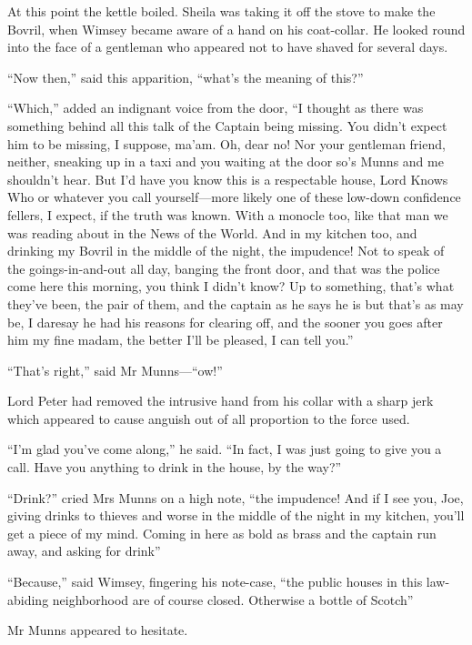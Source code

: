 At this point the kettle boiled. Sheila was taking it off the stove to make the Bovril, when Wimsey became aware of a hand on his coat-collar. He looked round into the face of a gentleman who appeared not to have shaved for several days.

\enquote{Now then,} said this apparition, \enquote{what's the meaning of this?}

\enquote{Which,} added an indignant voice from the door, \enquote{I thought as there was something behind all this talk of the Captain being missing. You didn't expect him to be missing, I suppose, ma'am. Oh, dear no! Nor your gentleman friend, neither, sneaking up in a taxi and you waiting at the door so's Munns and me shouldn't hear. But I'd have you know this is a respectable house, Lord Knows Who or whatever you call yourself\allowbreak---\allowbreak more likely one of these low-down confidence fellers, I expect, if the truth was known. With a monocle too, like that man we was reading about in the News of the World. And in my kitchen too, and drinking my Bovril in the middle of the night, the impudence! Not to speak of the goings-in-and-out all day, banging the front door, and that was the police come here this morning, you think I didn't know? Up to something, that's what they've been, the pair of them, and the captain as he says he is but that's as may be, I daresay he had his reasons for clearing off, and the sooner you goes after him my fine madam, the better I'll be pleased, I can tell you.}

\enquote{That's right,} said Mr Munns---\enquote{ow!}

Lord Peter had removed the intrusive hand from his collar with a sharp jerk which appeared to cause anguish out of all proportion to the force used.

\enquote{I'm glad you've come along,} he said. \enquote{In fact, I was just going to give you a call. Have you anything to drink in the house, by the way?}

\enquote{Drink?} cried Mrs Munns on a high note, \enquote{the impudence! And if I see you, Joe, giving drinks to thieves and worse in the middle of the night in my kitchen, you'll get a piece of my mind. Coming in here as bold as brass and the captain run away, and asking for drink\longdash}

\enquote{Because,} said Wimsey, fingering his note-case, \enquote{the public houses in this law-abiding neighborhood are of course closed. Otherwise a bottle of Scotch\longdash}

Mr Munns appeared to hesitate.

